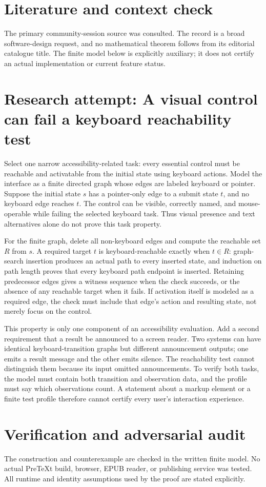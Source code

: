 \documentclass[11pt]{article}
\begin{document}
\section{Literature and context check}
The primary community-session source was consulted. The record is a broad software-design request, and no mathematical theorem follows from its editorial catalogue title. The finite model below is explicitly auxiliary; it does not certify an actual implementation or current feature status.
\section{Research attempt: A visual control can fail a keyboard reachability test}
Select one narrow accessibility-related task: every essential control must be reachable and activatable from the initial state using keyboard actions. Model the interface as a finite directed graph whose edges are labeled keyboard or pointer. Suppose the initial state $s$ has a pointer-only edge to a submit state $t$, and no keyboard edge reaches $t$. The control can be visible, correctly named, and mouse-operable while failing the selected keyboard task. Thus visual presence and text alternatives alone do not prove this task property.

For the finite graph, delete all non-keyboard edges and compute the reachable set $R$ from $s$. A required target $t$ is keyboard-reachable exactly when $t\in R$: graph-search insertion produces an actual path to every inserted state, and induction on path length proves that every keyboard path endpoint is inserted. Retaining predecessor edges gives a witness sequence when the check succeeds, or the absence of any reachable target when it fails. If activation itself is modeled as a required edge, the check must include that edge's action and resulting state, not merely focus on the control.

This property is only one component of an accessibility evaluation. Add a second requirement that a result be announced to a screen reader. Two systems can have identical keyboard-transition graphs but different announcement outputs; one emits a result message and the other emits silence. The reachability test cannot distinguish them because its input omitted announcements. To verify both tasks, the model must contain both transition and observation data, and the profile must say which observations count. A statement about a markup element or a finite test profile therefore cannot certify every user's interaction experience.
\section{Verification and adversarial audit}
The construction and counterexample are checked in the written finite model. No actual PreTeXt build, browser, EPUB reader, or publishing service was tested. All runtime and identity assumptions used by the proof are stated explicitly.
\end{document}
